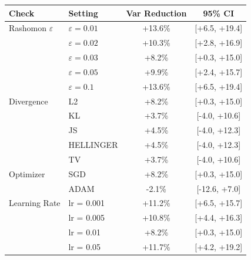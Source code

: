 \begin{tabular}{llcc}
\toprule
Check & Setting & Var Reduction & 95\% CI \\
\midrule
Rashomon $\varepsilon$ & $\varepsilon = 0.01$ & +13.6\% & [+6.5, +19.4] \\
 & $\varepsilon = 0.02$ & +10.3\% & [+2.8, +16.9] \\
 & $\varepsilon = 0.03$ & +8.2\% & [+0.3, +15.0] \\
 & $\varepsilon = 0.05$ & +9.9\% & [+2.4, +15.7] \\
 & $\varepsilon = 0.1$ & +13.6\% & [+6.5, +19.4] \\
\midrule
Divergence & L2 & +8.2\% & [+0.3, +15.0] \\
 & KL & +3.7\% & [-4.0, +10.6] \\
 & JS & +4.5\% & [-4.0, +12.3] \\
 & HELLINGER & +4.5\% & [-4.0, +12.3] \\
 & TV & +3.7\% & [-4.0, +10.6] \\
\midrule
Optimizer & SGD & +8.2\% & [+0.3, +15.0] \\
 & ADAM & -2.1\% & [-12.6, +7.0] \\
\midrule
Learning Rate & lr = 0.001 & +11.2\% & [+6.5, +15.7] \\
 & lr = 0.005 & +10.8\% & [+4.4, +16.3] \\
 & lr = 0.01 & +8.2\% & [+0.3, +15.0] \\
 & lr = 0.05 & +11.7\% & [+4.2, +19.2] \\
\bottomrule
\end{tabular}